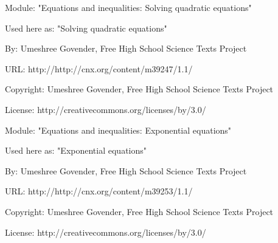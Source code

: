       \par\vspace{9pt}\noindent\begin{minipage}{\textwidth}
      Module: "Equations and inequalities: Solving quadratic equations" \par\nopagebreak\noindent
      Used here as: "Solving quadratic equations" \par\nopagebreak\noindent
        By: Umeshree Govender, Free High School Science Texts Project\par\nopagebreak\noindent
      URL: http://http://cnx.org/content/m39247/1.1/\par\nopagebreak\noindent
      \par\nopagebreak\noindent
      Copyright: Umeshree Govender, Free High School Science Texts Project\par\nopagebreak\noindent
      License:  http://creativecommons.org/licenses/by/3.0/\par\nopagebreak\noindent
      \par\end{minipage}
      \par\vspace{9pt}\noindent\begin{minipage}{\textwidth}
      Module: "Equations and inequalities: Exponential equations" \par\nopagebreak\noindent
      Used here as: "Exponential equations" \par\nopagebreak\noindent
        By: Umeshree Govender, Free High School Science Texts Project\par\nopagebreak\noindent
      URL: http://http://cnx.org/content/m39253/1.1/\par\nopagebreak\noindent
      \par\nopagebreak\noindent
      Copyright: Umeshree Govender, Free High School Science Texts Project\par\nopagebreak\noindent
      License:  http://creativecommons.org/licenses/by/3.0/\par\nopagebreak\noindent
      \par\end{minipage}
